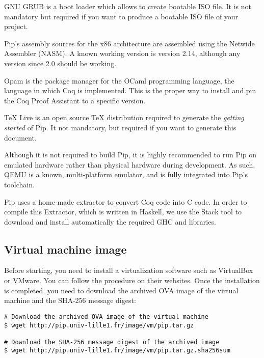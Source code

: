 \documentclass[10pt,a4paper,titlepage]{refart}
\begin{document}
 
GNU GRUB is a boot loader which allows to create bootable ISO file. It is not
mandatory but required if you want to produce a bootable ISO file of your
project.

 
Pip's assembly sources for the x86 architecture are assembled using the Netwide
Assembler (NASM). A known working version is version 2.14, although any version
since 2.0 should be working.

 
Opam is the package manager for the OCaml programming language, the language in
which Coq is implemented. This is the proper way to install and pin the Coq
Proof Assistant to a specific version.

 
TeX Live is an open source TeX distribution required to generate the
\textit{getting started} of Pip. It not mandatory, but required if you want to
generate this document.

 
Although it is not required to build Pip, it is highly recommended to run Pip on
emulated hardware rather than physical hardware during development. As such,
QEMU is a known, multi-platform emulator, and is fully integrated into Pip's
toolchain.

 
Pip uses a home-made extractor to convert Coq code into C code. In order to
compile this Extractor, which is written in Haskell, we use the Stack tool to
download and install automatically the required GHC and libraries.

\subsection{Virtual machine image}

Before starting, you need to install a virtualization software such as
VirtualBox or VMware. You can follow the procedure on their websites. Once the
installation is completed, you need to download the archived OVA image of the
virtual machine and the SHA-256 message digest:

\begin{lstlisting}[style=BashStyle]
# Download the archived OVA image of the virtual machine
$ wget http://pip.univ-lille1.fr/image/vm/pip.tar.gz

# Download the SHA-256 message digest of the archived image
$ wget http://pip.univ-lille1.fr/image/vm/pip.tar.gz.sha256sum
\end{lstlisting}
\end{document}
